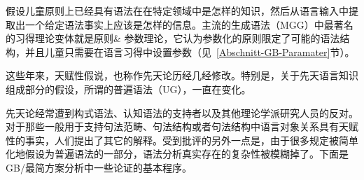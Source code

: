 \citet[]{Chomsky65a}假设儿童原则上已经具有语法在在特定领域中是怎样的知识，然后从语言输入中提取出一个给定语法事实上应该是怎样的信息。主流的生成语法（MGG）中最著名的习得理论变体就是原则\& 参数理论，它认为参数化的原则限定了可能的语法结构，并且儿童只需要在语言习得中设置参数（见~\ref{Abschnitt-GB-Paramater}节）。

这些年来，天赋性假说，也称作先天论历经几经修改。特别是，关于先天语言知识组成部分的假设，所谓的普遍语法（UG），一直在变化。

先天论经常遭到构式语法\indexcxg 、认知语法的支持者以及其他理论学派研究人员的反对。对于那些一般用于支持句法范畴、句法结构或者句法结构中语言对象关系具有天赋性的事实，人们提出了其它的解释。受到批评的另外一点是，由于很多规定被简单化地假设为普遍语法的一部分，语法分析真实存在的复杂性被模糊掉了。下面是GB/最简方案分析中一些论证的基本程序。

